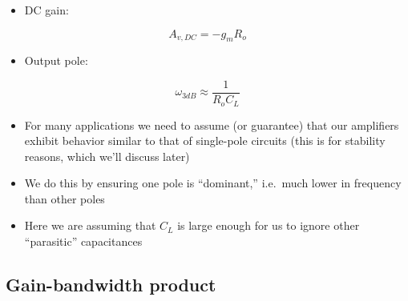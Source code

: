 \documentclass[11pt]{article}
\providecommand{\tightlist}{%
      \setlength{\itemsep}{0pt}\setlength{\parskip}{0pt}}
\begin{document}
    \begin{itemize}
\tightlist
\item
  DC gain:
\end{itemize}

\begin{equation}
A_{v,DC} = -g_m R_o
\end{equation}

\begin{itemize}
\tightlist
\item
  Output pole:
\end{itemize}

\begin{equation}
\omega_{3dB} \approx \dfrac{1}{R_o C_L}
\end{equation}

    \begin{itemize}
\tightlist
\item
  For many applications we need to assume (or guarantee) that our
  amplifiers exhibit behavior similar to that of single-pole circuits
  (this is for stability reasons, which we'll discuss later)
\item
  We do this by ensuring one pole is ``dominant,'' i.e.~much lower in
  frequency than other poles
\item
  Here we are assuming that \(C_L\) is large enough for us to ignore
  other ``parasitic'' capacitances
\end{itemize}

    \hypertarget{gain-bandwidth-product}{%
\subsection{Gain-bandwidth product}\label{gain-bandwidth-product}}
\end{document}
